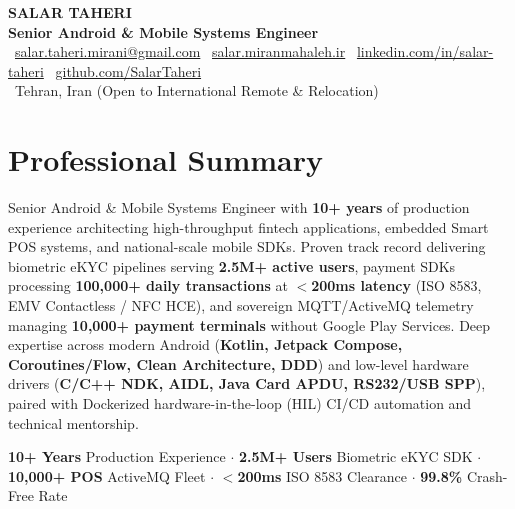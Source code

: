 \documentclass[letterpaper,10pt]{article}
\begin{document}
\begin{center}
  {\Huge\bfseries\color{darktext} SALAR TAHERI} \\[2pt]
  {\large\bfseries\color{lightgray} Senior Android \& Mobile Systems Engineer} \\[4pt]
  \small
  \faEnvelope\ \href{mailto:salar.taheri.mirani@gmail.com}{salar.taheri.mirani@gmail.com} \quad
  \faGlobe\ \href{https://salar.miranmahaleh.ir}{salar.miranmahaleh.ir} \quad
  \faLinkedin\ \href{https://www.linkedin.com/in/salar-taheri}{linkedin.com/in/salar-taheri} \quad
  \faGithub\ \href{https://github.com/SalarTaheri}{github.com/SalarTaheri} \\[2pt]
  \faMapMarker*\ Tehran, Iran {\color{lightgray}(Open to International Remote \& Relocation)}
\end{center}

\section{Professional Summary}
\small
Senior Android \& Mobile Systems Engineer with \textbf{10+ years} of production experience architecting high-throughput fintech applications, embedded Smart POS systems, and national-scale mobile SDKs. Proven track record delivering biometric eKYC pipelines serving \textbf{2.5M+ active users}, payment SDKs processing \textbf{100,000+ daily transactions} at \textbf{$<$200ms latency} (ISO 8583, EMV Contactless / NFC HCE), and sovereign MQTT/ActiveMQ telemetry managing \textbf{10,000+ payment terminals} without Google Play Services. Deep expertise across modern Android (\textbf{Kotlin, Jetpack Compose, Coroutines/Flow, Clean Architecture, DDD}) and low-level hardware drivers (\textbf{C/C++ NDK, AIDL, Java Card APDU, RS232/USB SPP}), paired with Dockerized hardware-in-the-loop (HIL) CI/CD automation and technical mentorship.

\vspace{3pt}
\begin{center}
  \footnotesize
  \textbf{\color{accent}10+ Years} Production Experience \enspace$\cdot$\enspace
  \textbf{\color{accent}2.5M+ Users} Biometric eKYC SDK \enspace$\cdot$\enspace
  \textbf{\color{accent}10,000+ POS} ActiveMQ Fleet \enspace$\cdot$\enspace
  \textbf{\color{accent}$<$200ms} ISO 8583 Clearance \enspace$\cdot$\enspace
  \textbf{\color{accent}99.8\%} Crash-Free Rate
\end{center}
\end{document}
